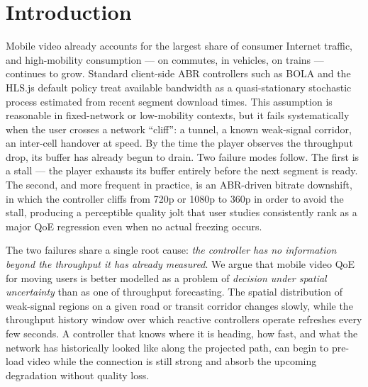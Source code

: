 \documentclass[conference]{IEEEtran}
\begin{document}
\section{Introduction}
Mobile video already accounts for the largest share of consumer Internet
traffic, and high-mobility consumption --- on commutes, in vehicles, on
trains --- continues to grow. Standard client-side ABR controllers such as
BOLA and the HLS.js default policy treat available bandwidth as a
quasi-stationary stochastic process estimated from recent segment download
times. This assumption is reasonable in fixed-network or low-mobility
contexts, but it fails systematically when the user crosses a network
``cliff'': a tunnel, a known weak-signal corridor, an inter-cell handover at
speed. By the time the player observes the throughput drop, its buffer has
already begun to drain. Two failure modes follow. The first is a stall ---
the player exhausts its buffer entirely before the next segment is ready.
The second, and more frequent in practice, is an ABR-driven bitrate
downshift, in which the controller cliffs from 720p or 1080p to 360p in
order to avoid the stall, producing a perceptible quality jolt that user
studies consistently rank as a major QoE regression even when no actual
freezing occurs.

The two failures share a single root cause: \emph{the controller has no
information beyond the throughput it has already measured}. We argue that
mobile video QoE for moving users is better modelled as a problem of
\emph{decision under spatial uncertainty} than as one of throughput
forecasting. The spatial distribution of weak-signal regions on a given
road or transit corridor changes slowly, while the throughput history
window over which reactive controllers operate refreshes every few seconds.
A controller that knows where it is heading, how fast, and what the network
has historically looked like along the projected path, can begin to
pre-load video while the connection is still strong and absorb the
upcoming degradation without quality loss.
\end{document}
